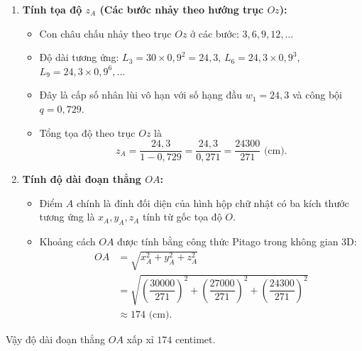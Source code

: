\begin{ex}
{\begin{enumerate}
\begin{itemize}
				\item Con châu chấu nhảy theo trục $Oy$ ở các bước: $2, 5, 8, 11, \dots$
				\item Độ dài tương ứng: $L_2 = 30 \times 0{,}9 = 27$, $L_5 = 27 \times 0{,}9^3$, $L_8 = 27 \times 0{,}9^6, \dots$
				\item Đây là cấp số nhân lùi vô hạn với số hạng đầu $v_1 = 27$ và công bội $q = 0{,}729$.
				\item Tổng tọa độ theo trục $Oy$ là
				\[ y_A = \displaystyle\dfrac{27}{1 - 0{,}729} = \dfrac{27}{0{,}271} = \dfrac{27000}{271} \text{ (cm)}. \]
			\end{itemize}
			\item \textbf{Tính tọa độ $z_A$ (Các bước nhảy theo hướng trục $Oz$):}
			\begin{itemize}
				\item Con châu chấu nhảy theo trục $Oz$ ở các bước: $3, 6, 9, 12, \dots$
				\item Độ dài tương ứng: $L_3 = 30 \times 0{,}9^2 = 24{,}3$, $L_6 = 24{,}3 \times 0{,}9^3$, $L_9 = 24{,}3 \times 0{,}9^6, \dots$
				\item Đây là cấp số nhân lùi vô hạn với số hạng đầu $w_1 = 24{,}3$ và công bội $q = 0{,}729$.
				\item Tổng tọa độ theo trục $Oz$ là
				\[ z_A = \displaystyle\dfrac{24{,}3}{1 - 0{,}729} = \dfrac{24{,}3}{0{,}271} = \dfrac{24300}{271} \text{ (cm)}. \]
			\end{itemize}
			\item \textbf{Tính độ dài đoạn thẳng $OA$:}
			\begin{itemize}
				\item Điểm $A$ chính là đỉnh đối diện của hình hộp chữ nhật có ba kích thước tương ứng là $x_A, y_A, z_A$ tính từ gốc tọa độ $O$.
				\item Khoảng cách $OA$ được tính bằng công thức Pitago trong không gian 3D:
				\begin{align*}
					OA &= \sqrt{x_A^2 + y_A^2 + z_A^2} \\
					&= \sqrt{\left(\dfrac{30000}{271}\right)^2 + \left(\dfrac{27000}{271}\right)^2 + \left(\dfrac{24300}{271}\right)^2} \\
					&\approx 174 \text{ (cm)}.
			\end{align*}\end{itemize}
		\end{enumerate}
		Vậy độ dài đoạn thẳng $OA$ xấp xỉ $174$ centimet.
	}
\end{ex}


